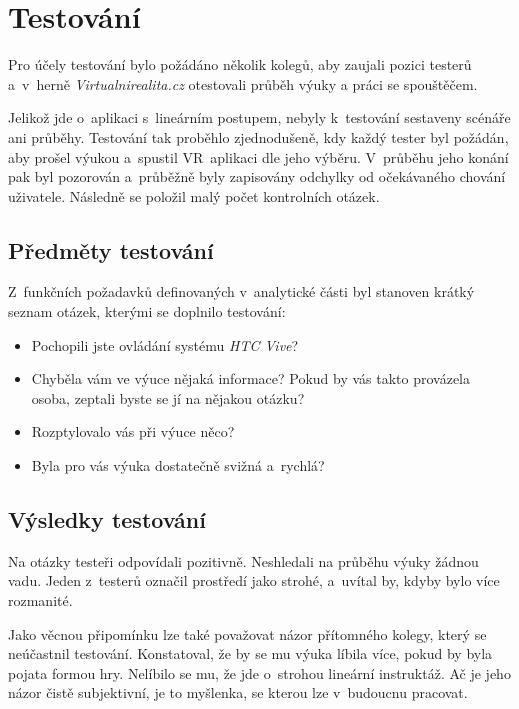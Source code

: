 \chapter{Testování}\label{testovuxe1nuxed}

Pro účely testování bylo požádáno několik kolegů, aby zaujali pozici
testerů a~v~herně \emph{Virtualnirealita.cz} otestovali průběh výuky a
práci se spouštěčem.

Jelikož jde o~aplikaci s~lineárním postupem, nebyly k~testování
sestaveny scénáře ani průběhy. Testování tak proběhlo zjednodušeně, kdy
každý tester byl požádán, aby prošel výukou a~spustil VR~aplikaci dle
jeho výběru. V~průběhu jeho konání pak byl pozorován a~průběžně
byly zapisovány odchylky od očekávaného chování uživatele. Následně se 
položil malý počet kontrolních otázek.

\section{Předměty testování}\label{pux159edmux11bty-testovuxe1nuxed}

Z~funkčních požadavků definovaných v~analytické části byl stanoven
krátký seznam otázek, kterými se doplnilo testování:

\begin{itemize}
  \item
    Pochopili jste ovládání systému \emph{HTC Vive}?
  \item
    Chyběla vám ve výuce nějaká informace? Pokud by vás takto provázela osoba,
    zeptali byste se jí na nějakou otázku?
  \item
    Rozptylovalo vás při výuce něco?
  \item
    Byla pro vás výuka dostatečně svižná a~rychlá?
\end{itemize}
    
\section{Výsledky testování}\label{vysledky-testovani}

Na otázky testeři odpovídali pozitivně. Neshledali na průběhu výuky
žádnou vadu. Jeden z~testerů označil prostředí jako strohé, a~uvítal by,
kdyby bylo více rozmanité.

Jako věcnou připomínku lze také považovat názor přítomného kolegy, který se
neúčastnil testování. Konstatoval, že by se mu výuka líbila více, pokud by byla
pojata formou hry. Nelíbilo se mu, že jde o~strohou lineární instruktáž. Ač je
jeho názor čistě subjektivní, je to myšlenka, se kterou lze v~budoucnu pracovat.

